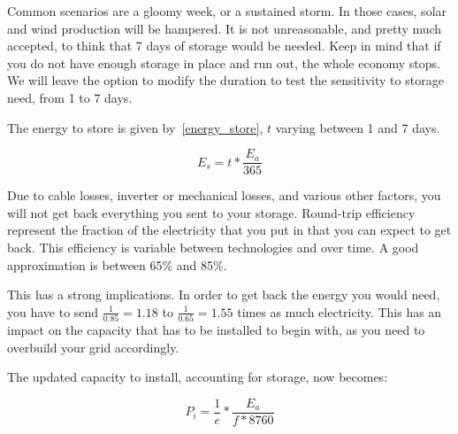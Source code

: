 Common scenarios are a gloomy week, or a sustained storm. In those cases, solar and wind production will be hampered. It is not unreasonable, and pretty much accepted, to think that 7 days of storage would be needed. Keep in mind that if you do not have enough storage in place and run out, the whole economy stops. We will leave the option to modify the duration to test the sensitivity to storage need, from 1 to 7 days.



\begin{remark}
The energy to store is given by~\ref{energy_store}, $t$ varying between 1 and 7 days.

\begin{equation}\label{energy_store}
E_s = t * \frac{E_a}{365}
\end{equation}

\end{remark}

Due to cable losses, inverter or mechanical losses, and various other factors, you will not get back everything you sent to your storage.
Round-trip efficiency represent the fraction of the electricity that you put in that you can expect to get back. This efficiency is variable between technologies and over time. A good approximation is between 65\% and 85\%. 

This has a strong implications. In order to get back the energy you would need, you have to send $\frac{1}{0.85} = 1.18$ to $\frac{1}{0.65} = 1.55$ times as much electricity. This has an impact on the capacity that has to be installed to begin with, as you need to overbuild your grid accordingly.


\begin{remark}
The updated capacity to install, accounting for storage, now becomes:

\begin{equation}\label{eqn_power_installed}
P_i = \frac{1}{e} * \frac{E_a}{f * 8760}
\end{equation}

\end{remark}


